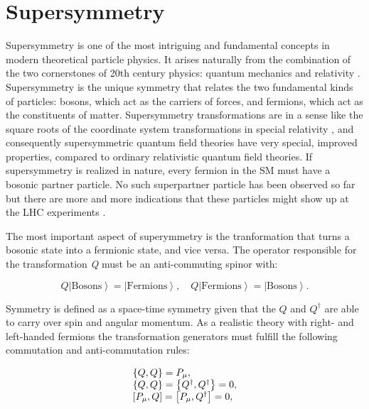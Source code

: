 \section{Supersymmetry}

Supersymmetry is one of the most intriguing and fundamental concepts in modern theoretical particle physics. It arises naturally from the combination of the two cornerstones of 20th century physics: quantum mechanics and relativity \cite{Miller:2013jra}. Supersymmetry is the unique symmetry that relates the two fundamental kinds of particles: bosons, which act as the carriers of forces, and fermions, which act as the constituents of matter. Supersymmetry transformations are in a sense like the square roots of the coordinate system transformations in special relativity \cite{Miller:2013jra}, and consequently supersymmetric quantum field theories have very special, improved properties, compared to ordinary relativistic quantum field theories. If supersymmetry is realized in nature, every fermion in the SM must have a bosonic partner particle. No such superpartner particle has been observed so far but there are more and more indications that these particles might show up at the LHC experiments \cite{Athron:2011wu}.

The most important aspect of superymmetry is the tranformation that turns a bosonic state into a fermionic state, and vice versa. The operator responsible for the transformation \textit{Q} must be an anti-commuting spinor with:

\begin{equation}
Q\left|\text{Bosons}\right> = \left|\text{Fermions}\right>, \quad Q\left|\text{Fermions}\right> = \left|\text{Bosons}\right>. 
\end{equation}

Symmetry is defined as a space-time symmetry given that the $Q$ and $Q^{\dagger}$ are able to carry over spin and angular momentum. As a realistic theory with right- and left-handed fermions the transformation generators must fulfill the following commutation and anti-commutation rules:

\begin{equation}
\begin{array}{l c l}
\left\{Q, Q\right\} = P_{\mu}, \\
\left\{Q, Q\right\} = \left\{Q^{\dagger}, Q^{\dagger}\right\} = 0, \\
\left[P_{\mu}, Q\right] = \left[P_{\mu}, Q^{\dagger}\right] = 0,
\end{array}
\end{equation}

